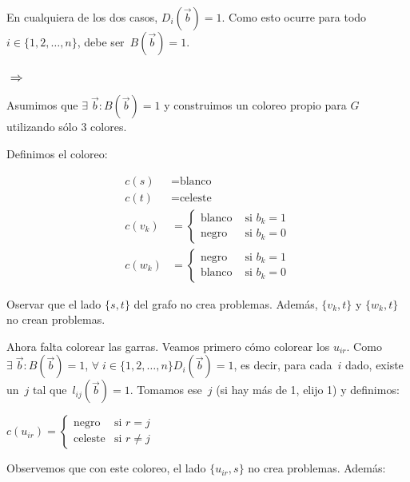 \documentclass[10pt,a4paper]{article}
\begin{document}
En cualquiera de los dos casos, $D_i(\overrightarrow{b}) = 1$. Como esto ocurre para todo $i \in \{1, 2, \dots, n\}$, debe ser $B(\overrightarrow{b}) = 1$.

\subsubsection*{$\Rightarrow $}

Asumimos que $\exists\; \overrightarrow{b} : B(\overrightarrow{b}) = 1$ y construimos un coloreo propio para $G$ utilizando sólo 3 colores.

Definimos el coloreo:

\begin{center}
\begin{align*} c(s) &= \text{blanco}\\ c(t) &= \text{celeste} \\ c(v_k) &= \begin{cases} \text{blanco} & \text{ si } b_k = 1\\ \text{negro} & \text{ si } b_k = 0 \end{cases}\\ c(w_k) &= \begin{cases} \text{negro} & \text{ si } b_k = 1\\ \text{blanco} & \text{ si } b_k = 0 \end{cases} \end{align*}
\end{center}

Oservar que el lado $\{s, t\}$ del grafo no crea problemas. Además, $\{v_k, t\}$ y $\{w_k, t\}$ no crean problemas.

Ahora falta colorear las garras. Veamos primero cómo colorear los $u_{ir}$. Como $\exists\; \overrightarrow{b} : B(\overrightarrow{b}) = 1$, $\forall\; i \in \{1, 2, \dots, n\} D_i(\overrightarrow{b}) = 1$, es decir, para cada $i$ dado, existe un $j$ tal que $ l_{ij}(\overrightarrow{b}) = 1$. Tomamos ese $j$ (si hay más de 1, elijo 1) y definimos:

\begin{center}
$c(u_{ir})= \begin{cases} \text{negro} & \text{si } r = j\\ \text{celeste} & \text{si } r \neq j \end{cases}$
\end{center}

Observemos que con este coloreo, el lado $\{u_{ir}, s\}$ no crea problemas. Además:
\end{document}
